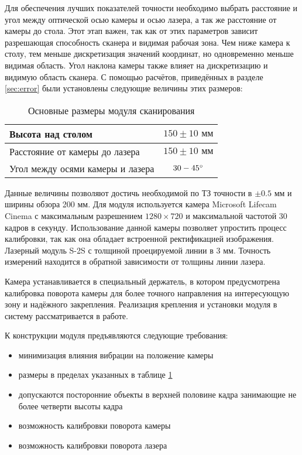        Для обеспечения лучших показателей точности необходимо выбрать расстояние и угол между оптической осью камеры и осью лазера, а так же расстояние от камеры до стола. Этот этап важен, так как от этих параметров зависит разрешающая способность сканера и видимая рабочая зона. Чем ниже камера к столу, тем меньше дискретизация значений координат, но одновременно меньше видимая область. Угол наклона камеры также влияет на дискретизацию и видимую область сканера.
        С помощью расчётов, приведённых в разделе \ref{sec:error} были установлены следующие величины этих размеров:
        \begin{table}[H]
            \centering
            \caption{Основные размеры модуля сканирования}\label{table:dims}
            \begin{tabular}{|l|c|} \hline
                Высота над столом& $ 150  \pm 10 \text{ мм} $\\ \hline
                Расстояние от камеры до лазера& $ 150  \pm 10 \text{ мм} $\\ \hline
                Угол между осями камеры и лазера& $ 30-45^{\circ} $\\ \hline
            \end{tabular}
        \end{table}
        Данные величины позволяют достичь необходимой по ТЗ точности в $ \pm 0.5 \text{ мм} $ и ширины обзора 200 мм.
        Для модуля используется камера Microsoft Lifecam Cinema с максимальным разрешением $ 1280 
        \times 720 $ и максимальной частотой 30 кадров в секунду. Использование данной камеры позволяет упростить процесс калибровки, так как она обладает встроенной ректификацией изображения. Лазерный модуль S-2S с толщиной проецируемой линии в 3 мм. Точность измерений находится в обратной зависимости от толщины линии лазера.

        Камера устанавливается в специальный держатель, в котором предусмотрена калибровка поворота камеры для более точного направления на интересующую зону и надёжного закрепления. Реализация крепления и установки модуля в систему рассматривается в работе\cite{matsu}. 

        К конструкции модуля предъявляются следующие требования:
        \begin{itemize}
            \item минимизация влияния вибрации на положение камеры
            \item размеры в пределах указанных в таблице \ref{table:dims}
            \item допускаются посторонние объекты в верхней половине кадра занимающие не более четверти высоты кадра
            \item возможность калибровки поворота камеры
            \item возможность калибровки поворота лазера
        \end{itemize}
    
